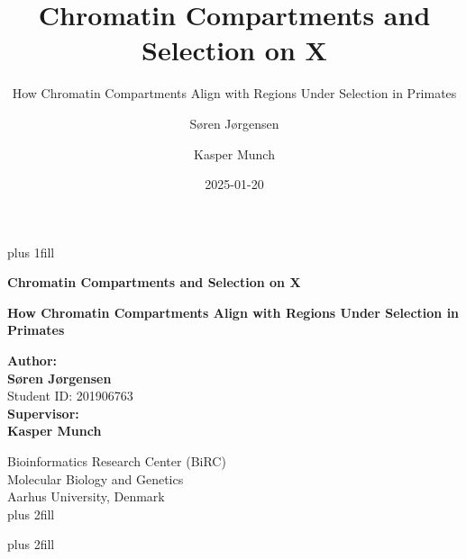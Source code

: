 \documentclass[
  11pt,
  a4paper,
]{scrbook}
\title{Chromatin Compartments and Selection on X}
\subtitle{How Chromatin Compartments Align with Regions Under Selection
in Primates}
\author{Søren Jørgensen \and Kasper Munch}
\date{2025-01-20}
\begin{document}
\frontmatter
\cleardoublepage
\thispagestyle{empty}
{\centering
\hbox{}\vskip 0cm plus 1fill

{%
\Huge\bfseries Chromatin Compartments and Selection on X \par}
\vspace{3ex}
{\Large\bfseries How Chromatin Compartments Align with Regions Under
Selection in Primates \par}
\vspace{5ex}

        {\bfseries Author: \\ \vspace{0.5ex}}
        {\bfseries\Large Søren Jørgensen \\ \vspace{0.7ex}}
            {\large Student ID: 201906763 \\ \vspace{1.2ex} }
        {\bfseries Supervisor: \\ \vspace{0.5ex}}
        {\bfseries\Large Kasper Munch \\ \vspace{0.7ex}}
        \par \vspace{0.7ex}
        {\large Bioinformatics Research Center (BiRC) \\ \vspace{0.7ex}}
        {\large Molecular Biology and Genetics \\ \vspace{0.7ex}}
        {\large Aarhus University, Denmark \\ \vspace{2ex}}
%
\vskip 0cm plus 2fill

{ \par}
\vskip 0cm plus 2fill

}
\end{document}
